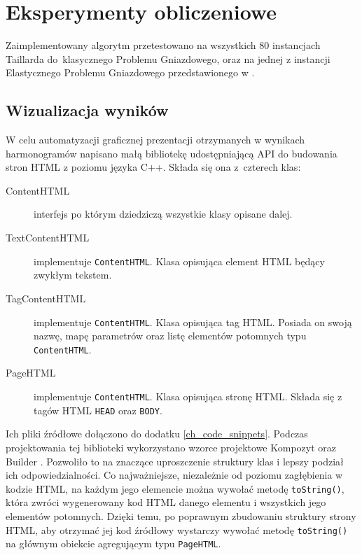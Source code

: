 \documentclass[printmode,oneside]{mgr}
\begin{document}
\chapter{Eksperymenty obliczeniowe \label{ch_experiments}}
Zaimplementowany algorytm przetestowano na wszystkich 80 instancjach Taillarda do~klasycznego Problemu Gniazdowego, oraz na jednej z instancji Elastycznego Problemu Gniazdowego przedstawionego w \cite{Kacem2002a}.

\section{Wizualizacja wyników}
W celu automatyzacji graficznej prezentacji otrzymanych w wynikach harmonogramów napisano małą bibliotekę udostępniającą API do budowania stron HTML z poziomu języka C++. Składa się ona z~czterech klas:
\begin{description}
    \item [ContentHTML] interfejs po którym dziedziczą wszystkie klasy opisane dalej.
    \item [TextContentHTML] implementuje \texttt{ContentHTML}. Klasa opisująca element HTML będący zwykłym tekstem.
    \item [TagContentHTML] implementuje \texttt{ContentHTML}. Klasa opisująca tag HTML. Posiada on swoją nazwę, mapę parametrów oraz listę  elementów potomnych typu \texttt{ContentHTML}.
    \item [PageHTML] implementuje \texttt{ContentHTML}. Klasa opisująca stronę HTML. Składa się z tagów HTML \texttt{HEAD} oraz \texttt{BODY}.
\end{description}
Ich pliki źródłowe dołączono do dodatku \ref{ch_code_snippets}. Podczas projektowania tej biblioteki wykorzystano wzorce projektowe Kompozyt oraz Builder \cite{GangOfFour}. Pozwoliło to na znaczące uproszczenie struktury klas i lepszy podział ich odpowiedzialności. Co najważniejsze, niezależnie od poziomu zagłębienia w kodzie HTML, na każdym jego elemencie można wywołać metodę \texttt{toString()}, która zwróci wygenerowany kod HTML danego elementu i wszystkich jego elementów potomnych. Dzięki temu, po poprawnym zbudowaniu struktury strony HTML, aby otrzymać jej kod źródłowy wystarczy wywołać metodę \texttt{toString()} na głównym obiekcie agregującym typu \texttt{PageHTML}.
%
\end{document}
